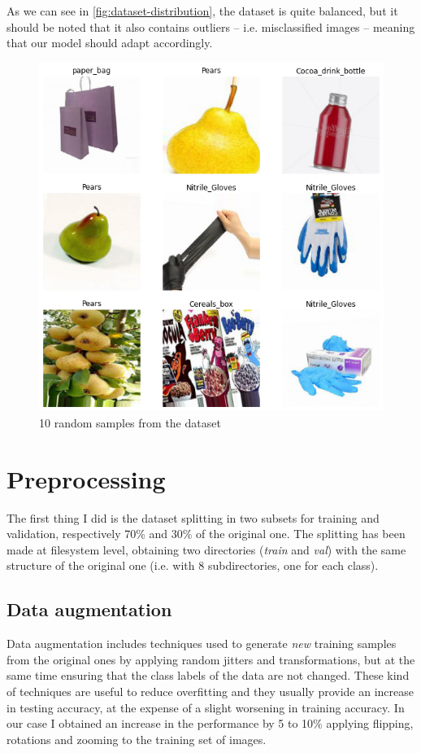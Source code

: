 \documentclass[11pt]{article}
\begin{document}
	\noindent
	As we can see in \autoref{fig:dataset-distribution}, the dataset is quite balanced,
	but it should be noted that it also contains outliers -- i.e. misclassified images --
	meaning that our model should adapt accordingly.

	\begin{figure}[H]
		\centering
		\includegraphics[width=\textwidth]{assets/dataset_samples.png}
		\caption{10 random samples from the dataset}
	\end{figure}



	\section{Preprocessing}
	The first thing I did is the dataset splitting in two subsets for training
	and validation, respectively 70\% and 30\% of the original one.
	The splitting has been made at filesystem level, obtaining two directories
	(\textit{train} and \textit{val}) with the same structure of the original
	one (i.e. with 8 subdirectories, one for each class).


	\subsection{Data augmentation}
	Data augmentation includes techniques used to generate \textit{new} training
	samples from the original ones by applying random jitters and transformations,
	but at the same time ensuring that the class labels of the data are not changed.
	These kind of techniques are useful to reduce overfitting and they usually provide
	an increase in testing accuracy, at the expense of a slight worsening in training accuracy.
	In our case I obtained an increase in the performance by 5 to 10\% applying
	flipping, rotations and zooming to the training set of images.
\end{document}
